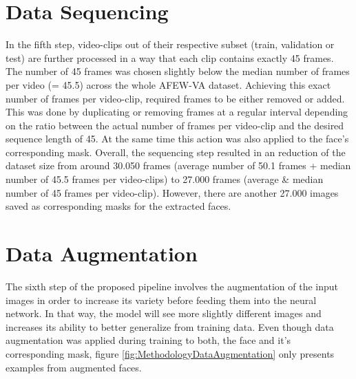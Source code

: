 \section{Data Sequencing}
In the fifth step, video-clips out of their respective subset (train, validation or test) are further processed in a way that each clip contains exactly 45 frames. The number of 45 frames was chosen slightly below the median number of frames per video (= 45.5) across the whole AFEW-VA dataset.
\newline\newline
Achieving this exact number of frames per video-clip, required frames to be either removed or added. This was done by duplicating or removing frames at a regular interval depending on the ratio between the actual number of frames per video-clip and the desired sequence length of 45. At the same time this action was also applied to the face's corresponding mask.
\newline\newline
Overall, the sequencing step resulted in an reduction of the dataset size from around 30.050 frames (average number of 50.1 frames + median number of 45.5 frames per video-clips) to 27.000 frames (average \& median number of 45 frames per video-clip). However, there are another 27.000 images saved as corresponding masks for the extracted faces.

\section{Data Augmentation}
The sixth step of the proposed pipeline involves the augmentation of the input images in order to increase its variety before feeding them into the neural network. In that way, the model will see more slightly different images and increases its ability to better generalize from training data. Even though data augmentation was applied during training to both, the face and it's corresponding mask, figure \ref{fig:MethodologyDataAugmentation} only presents examples from augmented faces.

